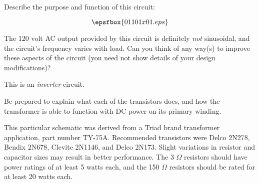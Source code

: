 

Describe the purpose and function of this circuit:

$$\epsfbox{01101x01.eps}$$

The 120 volt AC output provided by this circuit is definitely {\it not} sinusoidal, and the circuit's frequency varies with load.  Can you think of any way(s) to improve these aspects of the circuit (you need not show details of your design modifications)?







This is an {\it inverter} circuit.

\vskip 10pt

Be prepared to explain what each of the transistors does, and how the transformer is able to function with DC power on its primary winding.







This particular schematic was derived from a Triad brand transformer application, part number TY-75A.  Recommended transistors were Delco 2N278, Bendix 2N678, Clevite 2N1146, and Delco 2N173.  Slight variations in resistor and capacitor sizes may result in better performance.  The 3 $\Omega$ resistors should have power ratings of at least 5 watts each, and the 150 $\Omega$ resistors should be rated for at least 20 watts each.




